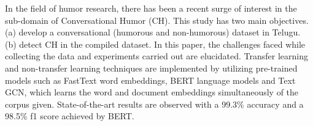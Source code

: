 In the field of humor research, there has been a recent surge of interest in the sub-domain of Conversational Humor (CH). This study has two main objectives. (a) develop a conversational (humorous and non-humorous) dataset in Telugu. (b) detect CH in the compiled dataset. In this paper, the challenges faced while collecting the data and experiments carried out are elucidated. Transfer learning and non-transfer learning techniques are implemented by utilizing pre-trained models such as FastText word embeddings, BERT language models and Text GCN, which learns the word and document embeddings simultaneously of the corpus given. State-of-the-art results are observed with a 99.3\% accuracy and a 98.5\% f1 score achieved by BERT.
